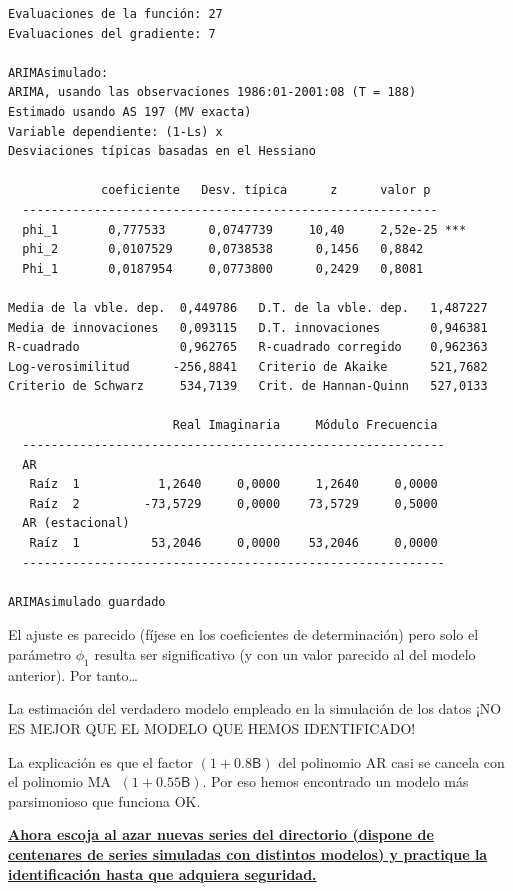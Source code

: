 \documentclass[10pt]{article}
\begin{document}
\begin{verbatim}
Evaluaciones de la función: 27
Evaluaciones del gradiente: 7

ARIMAsimulado:
ARIMA, usando las observaciones 1986:01-2001:08 (T = 188)
Estimado usando AS 197 (MV exacta)
Variable dependiente: (1-Ls) x
Desviaciones típicas basadas en el Hessiano

             coeficiente   Desv. típica      z      valor p 
  ----------------------------------------------------------
  phi_1       0,777533      0,0747739     10,40     2,52e-25 ***
  phi_2       0,0107529     0,0738538      0,1456   0,8842  
  Phi_1       0,0187954     0,0773800      0,2429   0,8081  

Media de la vble. dep.  0,449786   D.T. de la vble. dep.   1,487227
Media de innovaciones   0,093115   D.T. innovaciones       0,946381
R-cuadrado              0,962765   R-cuadrado corregido    0,962363
Log-verosimilitud      -256,8841   Criterio de Akaike      521,7682
Criterio de Schwarz     534,7139   Crit. de Hannan-Quinn   527,0133

                       Real Imaginaria     Módulo Frecuencia
  -----------------------------------------------------------
  AR
   Raíz  1           1,2640     0,0000     1,2640     0,0000
   Raíz  2         -73,5729     0,0000    73,5729     0,5000
  AR (estacional)
   Raíz  1          53,2046     0,0000    53,2046     0,0000
  -----------------------------------------------------------

ARIMAsimulado guardado
\end{verbatim}

El ajuste es parecido (fíjese en los coeficientes de determinación)
pero solo el parámetro \(\phi_1\) resulta ser significativo (y con un
valor parecido al del modelo anterior). Por tanto\ldots{}
\bigskip

La estimación del verdadero modelo empleado en la simulación de los
datos ¡NO ES MEJOR QUE EL MODELO QUE HEMOS IDENTIFICADO!

La explicación es que el factor \((1 + 0.8\mathsf{B})\) del polinomio AR
casi se cancela con el polinomio MA \(\;(1 + 0.55\mathsf{B})\). Por eso
hemos encontrado un modelo más parsimonioso que funciona OK.
\bigskip


\textbf{\uline{Ahora escoja al azar nuevas series del \href{https://github.com/mbujosab/EconometriaAplicada-SRC/tree/main/Ejercicios/IdentificaEstosARIMA}{directorio} (dispone de
 centenares de series simuladas con distintos modelos) y practique la
 identificación hasta que adquiera seguridad.}}
\end{document}
